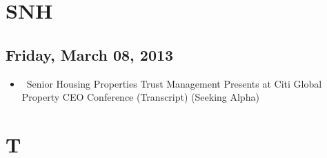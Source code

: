 \documentclass[11pt,asymmetric]{article}
\begin{document}
\section*{SNH}

\subsection*{Friday, March 08, 2013}
\begin{itemize}
\item\ Senior Housing Properties Trust Management Presents at Citi Global Property CEO Conference (Transcript) (Seeking Alpha)
\end{itemize}

\section*{T}
\end{document}
